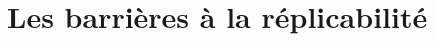 \documentclass[aspectratio=169,10pt,xcolor=x11names,english,french]{beamer}
\newcommand{\code}[1]{\textcolor{code}{\texttt{#1}}}
\begin{document}
	\section{Les barrières à la réplicabilité}
	
\end{document}
